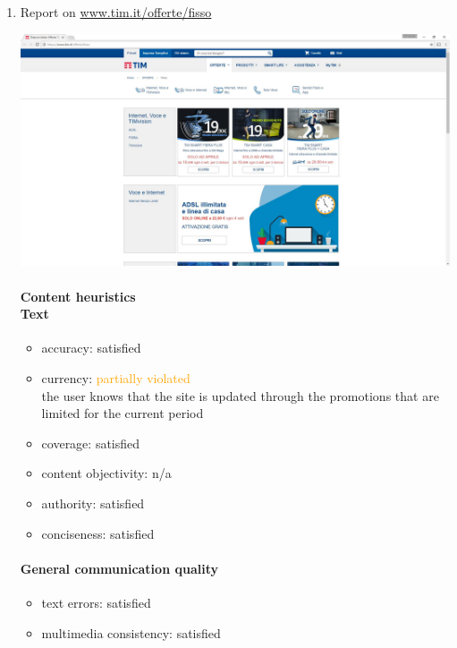 \begin{enumerate}

\item Report on \url{www.tim.it/offerte/fisso}

\begin{center}
	\includegraphics[width=\textwidth]{Screenshot/fisso.jpg}
\end{center}
\vspace{1cm}

	\paragraph*{Content heuristics \\ Text}
	\begin{itemize}
		\item accuracy: satisfied
		\item currency: \textcolor{orange}{partially violated}\\
		the user knows that the site is updated through the promotions that are limited for the current period
		\item coverage: satisfied
		\item content objectivity: n/a
		\item authority: satisfied
		\item conciseness: satisfied		
	\end{itemize}

	\paragraph*{General communication quality}
	\begin{itemize}
		\item text errors: satisfied
		\item multimedia consistency: satisfied
	\end{itemize}


\end{enumerate}
